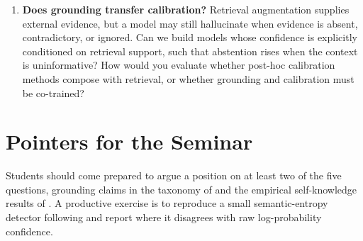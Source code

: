 \documentclass[11pt]{article}
\begin{document}
\begin{enumerate}[leftmargin=*,label=\textbf{Q\arabic*.}]
  \item \textbf{Does grounding transfer calibration?} Retrieval augmentation
  \citep{lewis2020retrieval} supplies external evidence, but a model may still
  hallucinate when evidence is absent, contradictory, or ignored. Can we build
  models whose confidence is explicitly conditioned on retrieval support, such
  that abstention rises when the context is uninformative? How would you
  evaluate whether post-hoc calibration methods \citep{guo2017calibration}
  compose with retrieval, or whether grounding and calibration must be
  co-trained?

\end{enumerate}

\section*{Pointers for the Seminar}

Students should come prepared to argue a position on at least two of the five
questions, grounding claims in the taxonomy of \citet{ji2023survey} and the
empirical self-knowledge results of \citet{kadavath2022know}. A productive
exercise is to reproduce a small semantic-entropy detector following
\citet{farquhar2024detecting} and report where it disagrees with raw
log-probability confidence.
\end{document}
